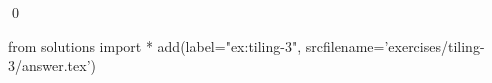 \begin{ex}
  \label{ex:tiling-3}
  
  \qed
\end{ex}
\begin{python0}
from solutions import *
add(label="ex:tiling-3",
    srcfilename='exercises/tiling-3/answer.tex') 
\end{python0}                              
